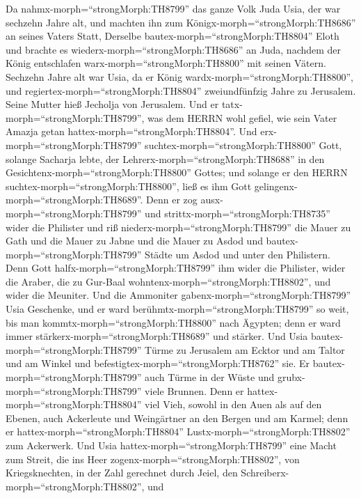  Da nahmx-morph=``strongMorph:TH8799'' das ganze Volk Juda
Usia, der war sechzehn Jahre alt, und machten ihn zum
Königx-morph=``strongMorph:TH8686'' an seines Vaters Statt, 
Derselbe bautex-morph=``strongMorph:TH8804'' Eloth und brachte es
wiederx-morph=``strongMorph:TH8686'' an Juda, nachdem der König
entschlafen warx-morph=``strongMorph:TH8800'' mit seinen Vätern.
 Sechzehn Jahre alt war Usia, da er König
wardx-morph=``strongMorph:TH8800'', und
regiertex-morph=``strongMorph:TH8804'' zweiundfünfzig Jahre zu
Jerusalem. Seine Mutter hieß Jecholja von Jerusalem.  Und er
tatx-morph=``strongMorph:TH8799'', was dem HERRN wohl gefiel, wie sein
Vater Amazja getan hattex-morph=``strongMorph:TH8804''.  Und
erx-morph=``strongMorph:TH8799'' suchtex-morph=``strongMorph:TH8800''
Gott, solange Sacharja lebte, der Lehrerx-morph=``strongMorph:TH8688''
in den Gesichtenx-morph=``strongMorph:TH8800'' Gottes; und solange er
den HERRN suchtex-morph=``strongMorph:TH8800'', ließ es ihm Gott
gelingenx-morph=``strongMorph:TH8689''.  Denn er zog
ausx-morph=``strongMorph:TH8799'' und
strittx-morph=``strongMorph:TH8735'' wider die Philister und riß
niederx-morph=``strongMorph:TH8799'' die Mauer zu Gath und die Mauer zu
Jabne und die Mauer zu Asdod und bautex-morph=``strongMorph:TH8799''
Städte um Asdod und unter den Philistern.  Denn Gott
halfx-morph=``strongMorph:TH8799'' ihm wider die Philister, wider die
Araber, die zu Gur-Baal wohntenx-morph=``strongMorph:TH8802'', und wider
die Meuniter.  Und die Ammoniter
gabenx-morph=``strongMorph:TH8799'' Usia Geschenke, und er ward
berühmtx-morph=``strongMorph:TH8799'' so weit, bis man
kommtx-morph=``strongMorph:TH8800'' nach Ägypten; denn er ward immer
stärkerx-morph=``strongMorph:TH8689'' und stärker.  Und Usia
bautex-morph=``strongMorph:TH8799'' Türme zu Jerusalem am Ecktor und am
Taltor und am Winkel und befestigtex-morph=``strongMorph:TH8762'' sie.
 Er bautex-morph=``strongMorph:TH8799'' auch Türme in der
Wüste und grubx-morph=``strongMorph:TH8799'' viele Brunnen. Denn er
hattex-morph=``strongMorph:TH8804'' viel Vieh, sowohl in den Auen als
auf den Ebenen, auch Ackerleute und Weingärtner an den Bergen und am
Karmel; denn er hattex-morph=``strongMorph:TH8804''
Lustx-morph=``strongMorph:TH8802'' zum Ackerwerk.  Und Usia
hattex-morph=``strongMorph:TH8799'' eine Macht zum Streit, die ins Heer
zogenx-morph=``strongMorph:TH8802'', von Kriegsknechten, in der Zahl
gerechnet durch Jeiel, den Schreiberx-morph=``strongMorph:TH8802'', und
